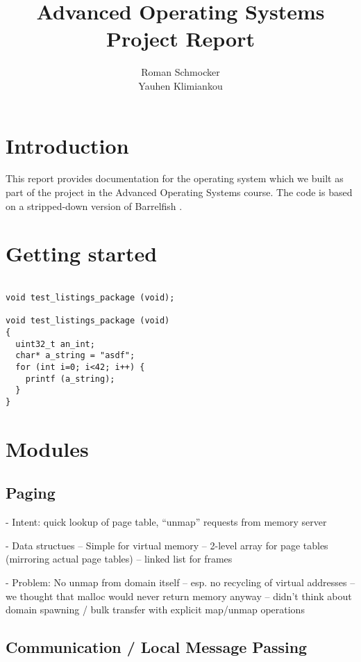 \documentclass[a4paper,10pt]{article}
\title{Advanced Operating Systems \\ Project Report}
\author{Roman Schmocker \\ Yauhen Klimiankou}
\begin{document}
\maketitle


\section{Introduction}

This report provides documentation for the operating system which we built as part of the project in the Advanced Operating Systems course.
The code is based on a stripped-down version of Barrelfish \cite {web:barrelfish}.


\section{Getting started}

\begin{lstlisting}

void test_listings_package (void);

void test_listings_package (void)
{
  uint32_t an_int;
  char* a_string = "asdf";
  for (int i=0; i<42; i++) {
    printf (a_string);
  }
}
\end{lstlisting}


\section {Modules}

\subsection{Paging}

- Intent: quick lookup of page table, ``unmap'' requests from memory server

- Data structues
-- Simple for virtual memory
-- 2-level array for page tables (mirroring actual page tables)
-- linked list for frames

- Problem: No unmap from domain itself
-- esp. no recycling of virtual addresses
-- we thought that malloc would never return memory anyway
-- didn't think about domain spawning / bulk transfer with explicit map/unmap operations

\subsection{Communication / Local Message Passing}
\end{document}
